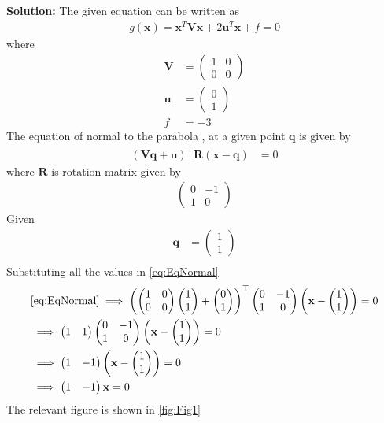 \documentclass[12pt]{article}
\providecommand{\brak}[1]{\ensuremath{\left(#1\right)}}
\newcommand{\solution}{\noindent \textbf{Solution: }}
\newcommand{\myvec}[1]{\ensuremath{\begin{pmatrix}#1\end{pmatrix}}}
\let\vec\mathbf
\begin{document}
\begin{enumerate}
\solution 
The given equation can be written as  
\begin{align}
	\label{eq:parabolaEq2}
	g\brak{\vec{x}} = \vec{x}^T\vec{V}\vec{x} + 2\vec{u}^T\vec{x} + f = 0 
\end{align}
where
\begin{align}
	\label{eq:eqV}
	\vec{V} &= \myvec{ 1 & 0 \\ 0 & 0} \\
	\label{eq:eqU}
	\vec{u} &= \myvec{0 \\ 1} \\
	\label{eq:eqF}
	f &= -3 
\end{align}
The equation of normal to the parabola , at a given point $\vec{q}$ is given by
\begin{align}
	\label{eq:EqNormal}
	\brak{\vec{V}\vec{q}+\vec{u}}^\top \vec{R}\brak{\vec{x}-\vec{q}}&= 0
\end{align}
where $\vec{R}$ is rotation matrix given by
\begin{align}
	\myvec{0 & -1 \\
	       1 & 0}
\end{align}
Given
\begin{align}
	\vec{q} &= \myvec{1 \\ 1} \\
\end{align}
Substituting all the values in \eqref{eq:EqNormal} 
\begin{align}
	&	\eqref{eq:EqNormal} \implies \brak{\myvec{1 & 0 \\ 0 &0}\myvec{1 \\ 1}+\myvec{0 \\ 1}}^\top \myvec{0 & -1 \\ 1 & 0}\brak{\vec{x}-\myvec{1 \\1}}= 0 \\
	&\implies \myvec{1 & 1 }\myvec{0 & -1 \\ 1 & 0}\brak{\vec{x}-\myvec{1 \\1}}= 0 \\
	&\implies \myvec{1 & -1 }\brak{\vec{x}-\myvec{1 \\1}}= 0 \\
	&\implies \myvec{1 & -1 }{\vec{x}} = 0 
\end{align}
The relevant figure is shown in \ref{fig:Fig1}
\begin{figure}[!h]
	\begin{center}

\end{center}
\end{figure}
\end{enumerate}
\end{document}
